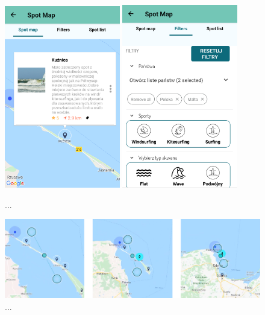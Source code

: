 \begin{figure}[h!]
	\begin{center}
		\includegraphics[width=0.45\textwidth]{img/mobile/map}
		\hspace{5mm}
		\includegraphics[width=0.45\textwidth]{img/mobile/filters-1}
	\end{center}
	\caption{...}
\end{figure}

\begin{figure}[h!]
    \begin{center}
        \includegraphics[width=1\textwidth]{img/mobile/clustering}
    \end{center}
    \caption{...}
\end{figure}



